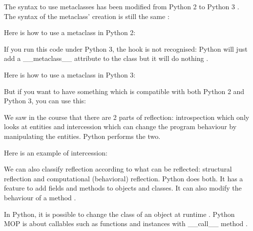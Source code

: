 The syntax to use metaclasses has been modified from Python 2 to Python 3 \cite{mikewatkins_metaclasses}. The syntax of the metaclass' creation is still the same \cite{python_doc_datamodel}:


Here is how to use a metaclass in Python 2:

If you run this code under Python 3, the hook is not recognised: Python will just add a \_\_metaclass\_\_ attribute to the class but it will do nothing \cite{artima_metaclasses_1of2}.
\newline

Here is how to use a metaclass in Python 3:


But if you want to have something which is compatible with both Python 2 and Python 3, you can use this:


We saw in the course that there are 2 parts of reflection: introspection which only looks at entities and intercession which can change the program behaviour by manipulating the entities. %
Python performs the two.
\newline

Here is an example of intercession:


%
%
%
%
%
%
%
%
%
%
%

We can also classify reflection according to what can be reflected: structural reflection and computational (behavioral) reflection. %
Python does both. It has a feature to add fields and methods to objects and classes. It can also modify the behaviour of a method \cite{mendez2011computational}.

In Python, it is possible to change the class of an object at runtime \cite{dynamic_lang_study}.
Python MOP is about callables such as functions and instances with \_\_call\_\_ method \cite{Russel_MOP}.

